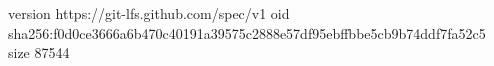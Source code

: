 version https://git-lfs.github.com/spec/v1
oid sha256:f0d0ce3666a6b470c40191a39575c2888e57df95ebffbbe5cb9b74ddf7fa52c5
size 87544
